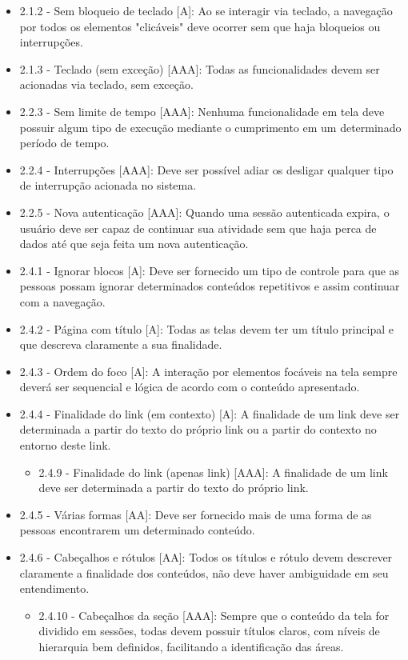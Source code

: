 {\begin{itemize}
\item 2.1.2 - Sem bloqueio de teclado [A]: Ao se interagir via teclado, a navegação por todos os elementos "clicáveis" deve ocorrer sem que haja bloqueios ou interrupções.
\item 2.1.3 - Teclado (sem exceção) [AAA]: Todas as funcionalidades devem ser acionadas via teclado, sem exceção.
\item 2.2.3 - Sem limite de tempo [AAA]: Nenhuma funcionalidade em tela deve possuir algum tipo de execução mediante o cumprimento em um determinado período de tempo.
\item 2.2.4 - Interrupções [AAA]: Deve ser possível adiar os desligar qualquer tipo de interrupção acionada no sistema.
\item 2.2.5 - Nova autenticação [AAA]: Quando uma sessão autenticada expira, o usuário deve ser capaz de continuar sua atividade sem que haja perca de dados até que seja feita um nova autenticação.
\item 2.4.1 - Ignorar blocos [A]: Deve ser fornecido um tipo de controle para que as pessoas possam ignorar determinados conteúdos repetitivos e assim continuar com a navegação.
\item 2.4.2 - Página com título [A]: Todas as telas devem ter um título principal e que descreva claramente a sua finalidade.
\item 2.4.3 - Ordem do foco [A]: A interação por elementos focáveis na tela sempre deverá ser sequencial e lógica de acordo com o conteúdo apresentado.
\item 2.4.4 - Finalidade do link (em contexto) [A]: A finalidade de um link deve ser determinada a partir do texto do próprio link ou a partir do contexto no entorno deste link.
\begin{itemize}
\item 2.4.9 - Finalidade do link (apenas link) [AAA]: A finalidade de um link deve ser determinada a partir do texto do próprio link.
\end{itemize}
\item 2.4.5 - Várias formas [AA]: Deve ser fornecido mais de uma forma de as pessoas encontrarem um determinado conteúdo. 
\item 2.4.6 - Cabeçalhos e rótulos [AA]: Todos os títulos e rótulo devem descrever claramente a finalidade dos conteúdos, não deve haver ambiguidade em seu entendimento.
\begin{itemize}
\item 2.4.10 - Cabeçalhos da seção [AAA]: Sempre que o conteúdo da tela for dividido em sessões, todas devem possuir títulos claros, com níveis de hierarquia bem definidos, facilitando a identificação das áreas.

\end{itemize}
\end{itemize}}
